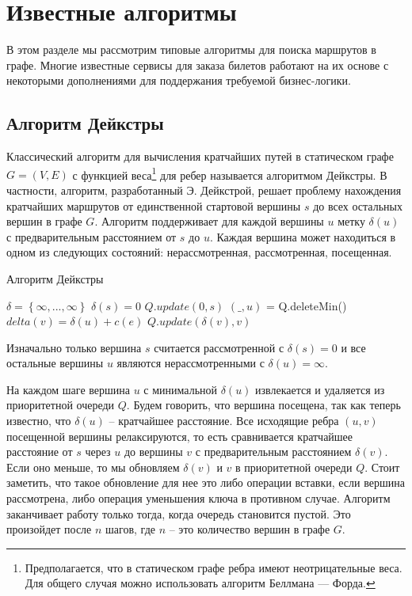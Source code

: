\section{Известные алгоритмы}
В этом разделе мы рассмотрим типовые алгоритмы для поиска маршрутов в графе. Многие известные сервисы для заказа билетов работают на их основе с некоторыми дополнениями для поддержания требуемой бизнес-логики.
\subsection{Алгоритм Дейкстры}
Классический алгоритм для вычисления кратчайших путей в статическом графе $G=(V, E)$ с функцией веса\footnote{Предполагается, что в статическом графе ребра имеют неотрицательные веса. Для общего случая можно использовать алгоритм Беллмана — Форда.} для ребер называется алгоритмом Дейкстры. В частности, алгоритм, разработанный Э. Дейкстрой, решает проблему нахождения кратчайших маршрутов от единственной стартовой вершины $s$ до всех остальных вершин в графе $G$. Алгоритм поддерживает для каждой вершины $u$ метку $\delta(u)$ с предварительным расстоянием от $s$ до $u$. Каждая вершина может находиться в одном из следующих состояний: нерассмотренная, рассмотренная, посещенная. 

\begin{algorithm}[!h]
	\caption{Алгоритм Дейкстры}\label{lst1}
	\begin{algorithmic}
		\State $\delta = \left\{\infty, ..., \infty\right\}$ 
		\State $\delta(s) = 0$ 
		\State $Q.update(0, s)$ 
		\State $(\_, u)$ = Q.deleteMin() 
		 
		\State $delta(v) = \delta(u) + c(e)$
		\State $Q.update(\delta(v), v)$
		\EndIf
		\EndFor
		\EndWhile
		\EndFunction
	\end{algorithmic}
\end{algorithm}

Изначально только вершина $s$ считается рассмотренной с $\delta(s)=0$ и все остальные вершины $u$ являются нерассмотренными с $\delta(u)=\infty$.

На каждом шаге вершина $u$ с минимальной $\delta(u)$ извлекается и удаляется из приоритетной очереди $Q$. Будем говорить, что вершина посещена, так как теперь известно, что $\delta(u)$ -- кратчайшее расстояние. Все исходящие ребра $(u, v)$ посещенной вершины релаксируются, то есть сравнивается кратчайшее расстояние от $s$ через $u$ до вершины $v$ с предварительным расстоянием $\delta(v)$. Если оно меньше, то мы обновляем $\delta(v)$ и $v$ в приоритетной очереди $Q$. Стоит заметить, что такое обновление для нее это либо операции вставки, если вершина рассмотрена, либо операция уменьшения ключа в противном случае. Алгоритм заканчивает работу только тогда, когда очередь становится пустой. Это произойдет после $n$ шагов, где $n$ -- это количество вершин в графе $G$.

